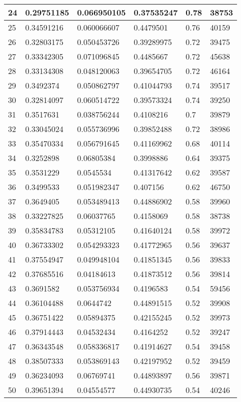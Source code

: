 \begin{longtable}{|l|l|l|l|l|l|}
24 & 0.29751185 & 0.066950105 & 0.37535247 & 0.78 & 38753 \\ \hline 
25 & 0.34591216 & 0.060066607 & 0.4479501 & 0.76 & 40159 \\ \hline 
26 & 0.32803175 & 0.050453726 & 0.39289975 & 0.72 & 39475 \\ \hline 
27 & 0.33342305 & 0.071096845 & 0.4485667 & 0.72 & 45638 \\ \hline 
28 & 0.33134308 & 0.048120063 & 0.39654705 & 0.72 & 46164 \\ \hline 
29 & 0.3492374 & 0.050862797 & 0.41044793 & 0.74 & 39517 \\ \hline 
30 & 0.32814097 & 0.060514722 & 0.39573324 & 0.74 & 39250 \\ \hline 
31 & 0.3517631 & 0.038756244 & 0.4108216 & 0.7 & 39879 \\ \hline 
32 & 0.33045024 & 0.055736996 & 0.39852488 & 0.72 & 38986 \\ \hline 
33 & 0.35470334 & 0.056791645 & 0.41169962 & 0.68 & 40114 \\ \hline 
34 & 0.3252898 & 0.06805384 & 0.3998886 & 0.64 & 39375 \\ \hline 
35 & 0.3531229 & 0.0545534 & 0.41317642 & 0.62 & 39587 \\ \hline 
36 & 0.3499533 & 0.051982347 & 0.407156 & 0.62 & 46750 \\ \hline 
37 & 0.3649405 & 0.053489413 & 0.44886902 & 0.58 & 39960 \\ \hline 
38 & 0.33227825 & 0.06037765 & 0.4158069 & 0.58 & 38738 \\ \hline 
39 & 0.35834783 & 0.05312105 & 0.41640124 & 0.58 & 39972 \\ \hline 
40 & 0.36733302 & 0.054293323 & 0.41772965 & 0.56 & 39637 \\ \hline 
41 & 0.37554947 & 0.049948104 & 0.41851345 & 0.56 & 39833 \\ \hline 
42 & 0.37685516 & 0.04184613 & 0.41873512 & 0.56 & 39814 \\ \hline 
43 & 0.3691582 & 0.053756934 & 0.4196583 & 0.54 & 59456 \\ \hline 
44 & 0.36104488 & 0.0644742 & 0.44891515 & 0.52 & 39908 \\ \hline 
45 & 0.36751422 & 0.05894375 & 0.42155245 & 0.52 & 39973 \\ \hline 
46 & 0.37914443 & 0.04532434 & 0.4164252 & 0.52 & 39247 \\ \hline 
47 & 0.36343548 & 0.058336817 & 0.41914627 & 0.54 & 39458 \\ \hline 
48 & 0.38507333 & 0.053869143 & 0.42197952 & 0.52 & 39459 \\ \hline 
49 & 0.36234093 & 0.06769741 & 0.44893897 & 0.56 & 39871 \\ \hline 
50 & 0.39651394 & 0.04554577 & 0.44930735 & 0.54 & 40246 \\ \hline 
\end{longtable}